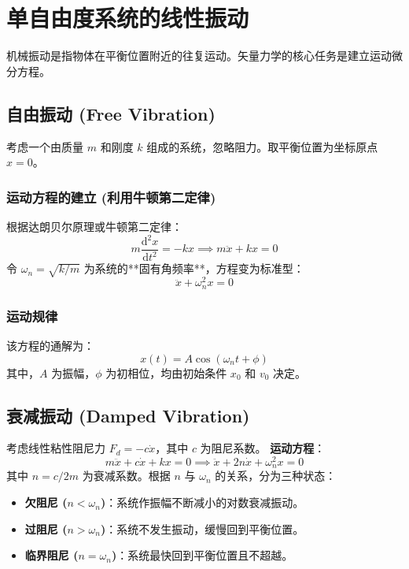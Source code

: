 \documentclass[12pt,a4paper]{article}
\newcommand{\dder}[2]{\frac{\mathrm{d}^2 #1}{\mathrm{d} #2^2}}   %
\begin{document}
\section{单自由度系统的线性振动}

机械振动是指物体在平衡位置附近的往复运动。矢量力学的核心任务是建立运动微分方程。

\subsection{自由振动 (Free Vibration)}
考虑一个由质量 $m$ 和刚度 $k$ 组成的系统，忽略阻力。取平衡位置为坐标原点 $x=0$。

\subsubsection{运动方程的建立 (利用牛顿第二定律)}
根据达朗贝尔原理或牛顿第二定律：
\begin{equation}
    m\dder{x}{t} = -kx \implies m\ddot{x} + kx = 0
\end{equation}
令 $\omega_n = \sqrt{k/m}$ 为系统的**固有角频率**，方程变为标准型：
\begin{equation}
    \ddot{x} + \omega_n^2 x = 0
\end{equation}

\subsubsection{运动规律}
该方程的通解为：
\begin{equation}
    x(t) = A \cos(\omega_n t + \phi)
\end{equation}
其中，$A$ 为振幅，$\phi$ 为初相位，均由初始条件 $x_0$ 和 $v_0$ 决定。



\subsection{衰减振动 (Damped Vibration)}
考虑线性粘性阻尼力 $F_d = -c\dot{x}$，其中 $c$ 为阻尼系数。
\textbf{运动方程}：
\begin{equation}
    m\ddot{x} + c\dot{x} + kx = 0 \implies \ddot{x} + 2n\dot{x} + \omega_n^2 x = 0
\end{equation}
其中 $n = c/2m$ 为衰减系数。根据 $n$ 与 $\omega_n$ 的关系，分为三种状态：
\begin{itemize}
    \item \textbf{欠阻尼 ($n < \omega_n$)}：系统作振幅不断减小的对数衰减振动。
    \item \textbf{过阻尼 ($n > \omega_n$)}：系统不发生振动，缓慢回到平衡位置。
    \item \textbf{临界阻尼 ($n = \omega_n$)}：系统最快回到平衡位置且不超越。
\end{itemize}
\end{document}
